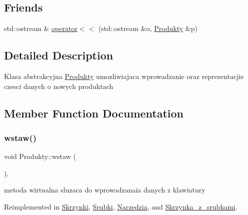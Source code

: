 \subsection*{Friends}
\begin{DoxyCompactItemize}
\item 
std\+::ostream \& \mbox{\hyperlink{class_produkty_a222d7f697f1aa66b79aefe7163945973}{operator$<$$<$}} (std\+::ostream \&o, \mbox{\hyperlink{class_produkty}{Produkty}} \&p)
\end{DoxyCompactItemize}


\subsection{Detailed Description}
Klasa abstrakcyjna \mbox{\hyperlink{class_produkty}{Produkty}} umozliwiajaca wprowadzanie oraz reprezentacjie czesci danych o nowych produktach 

\subsection{Member Function Documentation}
\mbox{\label{class_produkty_ad69fa64c8984c55fe9b1a2ade607a0ed}} 
\subsubsection{\texorpdfstring{wstaw()}{wstaw()}}
{\footnotesize\ttfamily void Produkty\+::wstaw (\begin{DoxyParamCaption}{ }\end{DoxyParamCaption})\hspace{0.3cm}{\ttfamily [protected]}, {\ttfamily [virtual]}}

metoda wirtualna sluzaca do wprowadzanaia danych z klawiatury 

Reimplemented in \mbox{\hyperlink{class_skrzynki_a764d5064b25a294b3309dc5077a77921}{Skrzynki}}, \mbox{\hyperlink{class_srubki_a129b7fcf23ad1928f196ca255aa66438}{Srubki}}, \mbox{\hyperlink{class_narzedzia_ade1bd4ecf05c894b263791bfcf0f876f}{Narzedzia}}, and \mbox{\hyperlink{class_skrzynka__z__srubkami_a4726c1844080cb96e833cf16e977ecb3}{Skrzynka\+\_\+z\+\_\+srubkami}}.

\mbox{\label{class_produkty_a73fe67e794f741b972330c09a8cf8e55}} 
